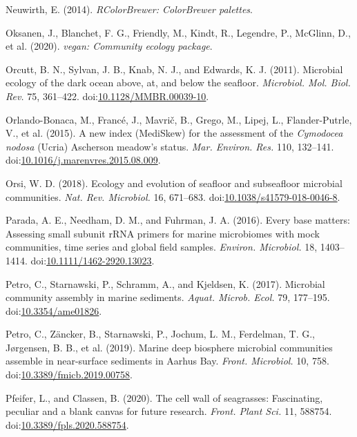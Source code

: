 \documentclass[12pt,]{article}
\begin{document}
\leavevmode\hypertarget{ref-Neuwirth2014}{}%
Neuwirth, E. (2014). \emph{RColorBrewer: ColorBrewer palettes}.

\leavevmode\hypertarget{ref-Oksanen2020}{}%
Oksanen, J., Blanchet, F. G., Friendly, M., Kindt, R., Legendre, P.,
McGlinn, D., et al. (2020). \emph{vegan: Community ecology package}.

\leavevmode\hypertarget{ref-Orcutt2011a}{}%
Orcutt, B. N., Sylvan, J. B., Knab, N. J., and Edwards, K. J. (2011).
Microbial ecology of the dark ocean above, at, and below the seafloor.
\emph{Microbiol. Mol. Biol. Rev.} 75, 361--422.
doi:\href{https://doi.org/10.1128/MMBR.00039-10}{10.1128/MMBR.00039-10}.

\leavevmode\hypertarget{ref-Orlando-Bonaca2015}{}%
Orlando-Bonaca, M., Francé, J., Mavrič, B., Grego, M., Lipej, L.,
Flander-Putrle, V., et al. (2015). A new index (MediSkew) for the
assessment of the \emph{Cymodocea nodosa} (Ucria) Ascherson meadow's
status. \emph{Mar. Environ. Res.} 110, 132--141.
doi:\href{https://doi.org/10.1016/j.marenvres.2015.08.009}{10.1016/j.marenvres.2015.08.009}.

\leavevmode\hypertarget{ref-Orsi2018}{}%
Orsi, W. D. (2018). Ecology and evolution of seafloor and subseafloor
microbial communities. \emph{Nat. Rev. Microbiol.} 16, 671--683.
doi:\href{https://doi.org/10.1038/s41579-018-0046-8}{10.1038/s41579-018-0046-8}.

\leavevmode\hypertarget{ref-Parada2016a}{}%
Parada, A. E., Needham, D. M., and Fuhrman, J. A. (2016). Every base
matters: Assessing small subunit rRNA primers for marine microbiomes
with mock communities, time series and global field samples.
\emph{Environ. Microbiol.} 18, 1403--1414.
doi:\href{https://doi.org/10.1111/1462-2920.13023}{10.1111/1462-2920.13023}.

\leavevmode\hypertarget{ref-Petro2017a}{}%
Petro, C., Starnawski, P., Schramm, A., and Kjeldsen, K. (2017).
Microbial community assembly in marine sediments. \emph{Aquat. Microb.
Ecol.} 79, 177--195.
doi:\href{https://doi.org/10.3354/ame01826}{10.3354/ame01826}.

\leavevmode\hypertarget{ref-Petro2019}{}%
Petro, C., Zäncker, B., Starnawski, P., Jochum, L. M., Ferdelman, T. G.,
Jørgensen, B. B., et al. (2019). Marine deep biosphere microbial
communities assemble in near-surface sediments in Aarhus Bay.
\emph{Front. Microbiol.} 10, 758.
doi:\href{https://doi.org/10.3389/fmicb.2019.00758}{10.3389/fmicb.2019.00758}.

\leavevmode\hypertarget{ref-Pfeifer2020}{}%
Pfeifer, L., and Classen, B. (2020). The cell wall of seagrasses:
Fascinating, peculiar and a blank canvas for future research.
\emph{Front. Plant Sci.} 11, 588754.
doi:\href{https://doi.org/10.3389/fpls.2020.588754}{10.3389/fpls.2020.588754}.
\end{document}
